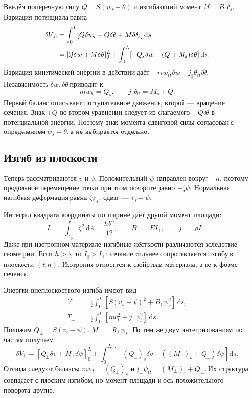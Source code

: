 \documentclass[11pt,a4paper]{article}
\newcommand{\dd}{\,\mathrm d}
\begin{document}
Введём поперечную силу $Q=S(w_s-\theta)$ и изгибающий момент $M=B_\parallel\theta_s$. Вариация потенциала равна
\[
\begin{aligned}
\delta V_{\rm pl}
&=\int_0^L[Q\delta w_s-Q\delta\theta+M\delta\theta_s]\dd s\\
&=[Q\delta w+M\delta\theta]_0^L
+\int_0^L[-Q_s\delta w-(Q+M_s)\delta\theta]\dd s.
\end{aligned}
\]
Вариация кинетической энергии в действии даёт $-mw_{tt}\delta w-j_\parallel\theta_{tt}\delta\theta$. Независимость $\delta w,\delta\theta$ приводит к
\[
mw_{tt}=Q_s,\qquad j_\parallel\theta_{tt}=M_s+Q.
\]
Первый баланс описывает поступательное движение, второй --- вращение сечения. Знак $+Q$ во втором уравнении следует из слагаемого $-Q\delta\theta$ в потенциальной энергии. Поэтому знак момента сдвиговой силы согласован с определением $w_s-\theta$, а не выбирается отдельно.

\subsection{Изгиб из плоскости}
Теперь рассматриваются $v$ и $\psi$. Положительный $\psi$ направлен вокруг $-n$, поэтому продольное перемещение точки при этом повороте равно $+\zeta\psi$. Нормальная изгибная деформация равна $\zeta\psi_s$, сдвиг --- $v_s-\psi$.

Интеграл квадрата координаты по ширине даёт другой момент площади:
\[
I_\perp=\int_{A_0}\zeta^2\dd A=\frac{hb^3}{12},\qquad
B_\perp=EI_\perp,\qquad j_\perp=\rho I_\perp.
\]
Даже при изотропном материале изгибные жёсткости различаются вследствие геометрии. Если $h>b$, то $I_\parallel>I_\perp$: сечение сильнее сопротивляется изгибу в плоскости $(t,n)$. Изотропия относится к свойствам материала, а не к форме сечения.

Энергии внеплоскостного изгиба имеют вид
\[
\begin{aligned}
V_\perp&=\frac12\int_0^L[S(v_s-\psi)^2+B_\perp\psi_s^2]\dd s,\\
T_\perp&=\frac12\int_0^L[mv_t^2+j_\perp\psi_t^2]\dd s.
\end{aligned}
\]
Положим $Q_\perp=S(v_s-\psi)$, $M_\perp=B_\perp\psi_s$. По тем же двум интегрированиям по частям получаем
\[
\delta V_\perp=[Q_\perp\delta v+M_\perp\delta\psi]_0^L
+\int_0^L[-(Q_\perp)_s\delta v-((M_\perp)_s+Q_\perp)\delta\psi]\dd s.
\]
Отсюда следуют балансы $mv_{tt}=(Q_\perp)_s$ и $j_\perp\psi_{tt}=(M_\perp)_s+Q_\perp$. Их структура совпадает с плоским изгибом, но момент площади и ось положительного поворота другие.
\end{document}
